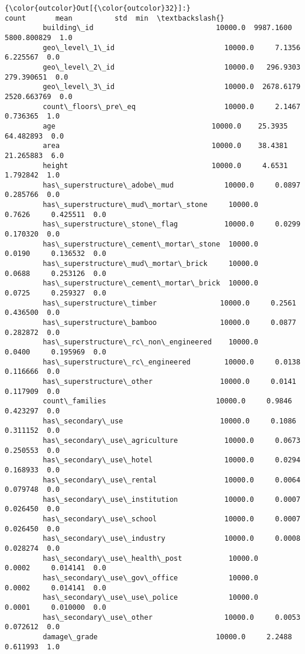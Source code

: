 \documentclass[11pt]{article}
\begin{document}
\begin{Verbatim}[commandchars=\\\{\}]
{\color{outcolor}Out[{\color{outcolor}32}]:}                                           count       mean          std  min  \textbackslash{}
         building\_id                             10000.0  9987.1600  5800.800829  1.0   
         geo\_level\_1\_id                          10000.0     7.1356     6.225567  0.0   
         geo\_level\_2\_id                          10000.0   296.9303   279.390651  0.0   
         geo\_level\_3\_id                          10000.0  2678.6179  2520.663769  0.0   
         count\_floors\_pre\_eq                     10000.0     2.1467     0.736365  1.0   
         age                                     10000.0    25.3935    64.482893  0.0   
         area                                    10000.0    38.4381    21.265883  6.0   
         height                                  10000.0     4.6531     1.792842  1.0   
         has\_superstructure\_adobe\_mud            10000.0     0.0897     0.285766  0.0   
         has\_superstructure\_mud\_mortar\_stone     10000.0     0.7626     0.425511  0.0   
         has\_superstructure\_stone\_flag           10000.0     0.0299     0.170320  0.0   
         has\_superstructure\_cement\_mortar\_stone  10000.0     0.0190     0.136532  0.0   
         has\_superstructure\_mud\_mortar\_brick     10000.0     0.0688     0.253126  0.0   
         has\_superstructure\_cement\_mortar\_brick  10000.0     0.0725     0.259327  0.0   
         has\_superstructure\_timber               10000.0     0.2561     0.436500  0.0   
         has\_superstructure\_bamboo               10000.0     0.0877     0.282872  0.0   
         has\_superstructure\_rc\_non\_engineered    10000.0     0.0400     0.195969  0.0   
         has\_superstructure\_rc\_engineered        10000.0     0.0138     0.116666  0.0   
         has\_superstructure\_other                10000.0     0.0141     0.117909  0.0   
         count\_families                          10000.0     0.9846     0.423297  0.0   
         has\_secondary\_use                       10000.0     0.1086     0.311152  0.0   
         has\_secondary\_use\_agriculture           10000.0     0.0673     0.250553  0.0   
         has\_secondary\_use\_hotel                 10000.0     0.0294     0.168933  0.0   
         has\_secondary\_use\_rental                10000.0     0.0064     0.079748  0.0   
         has\_secondary\_use\_institution           10000.0     0.0007     0.026450  0.0   
         has\_secondary\_use\_school                10000.0     0.0007     0.026450  0.0   
         has\_secondary\_use\_industry              10000.0     0.0008     0.028274  0.0   
         has\_secondary\_use\_health\_post           10000.0     0.0002     0.014141  0.0   
         has\_secondary\_use\_gov\_office            10000.0     0.0002     0.014141  0.0   
         has\_secondary\_use\_use\_police            10000.0     0.0001     0.010000  0.0   
         has\_secondary\_use\_other                 10000.0     0.0053     0.072612  0.0   
         damage\_grade                            10000.0     2.2488     0.611993  1.0   
         

\end{Verbatim}
\end{document}
